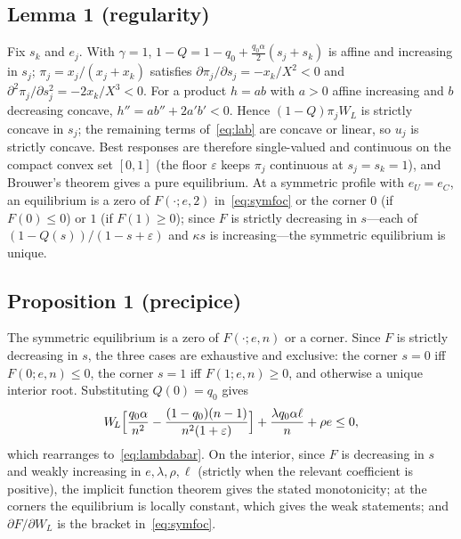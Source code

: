 \documentclass[11pt]{article}
\theoremstyle{plain}
\theoremstyle{definition}
\theoremstyle{remark}
\newcommand{\WL}{W_{\!L}}
\begin{document}
\subsection{Lemma 1 (regularity)}
Fix $s_k$ and $e_j$. With $\gamma=1$, $1-Q=1-q_0+\tfrac{q_0\alpha}{2}(s_j+s_k)$ is affine and increasing in $s_j$; $\pi_j=x_j/(x_j+x_k)$ satisfies $\partial\pi_j/\partial s_j=-x_k/X^2<0$ and $\partial^2\pi_j/\partial s_j^2=-2x_k/X^3<0$. For a product $h=ab$ with $a>0$ affine increasing and $b$ decreasing concave, $h''=ab''+2a'b'<0$. Hence $(1-Q)\pi_j\WL$ is strictly concave in $s_j$; the remaining terms of~\eqref{eq:lab} are concave or linear, so $u_j$ is strictly concave. Best responses are therefore single-valued and continuous on the compact convex set $[0,1]$ (the floor $\varepsilon$ keeps $\pi_j$ continuous at $s_j=s_k=1$), and Brouwer's theorem gives a pure equilibrium. At a symmetric profile with $e_U=e_C$, an equilibrium is a zero of $F(\cdot;e,2)$ in~\eqref{eq:symfoc} or the corner $0$ (if $F(0)\le0$) or $1$ (if $F(1)\ge0$); since $F$ is strictly decreasing in $s$---each of $(1-Q(s))/(1-s+\varepsilon)$ and $\kappa s$ is increasing---the symmetric equilibrium is unique.

\subsection{Proposition 1 (precipice)}
The symmetric equilibrium is a zero of $F(\cdot;e,n)$ or a corner. Since $F$ is strictly decreasing in $s$, the three cases are exhaustive and exclusive: the corner $s=0$ iff $F(0;e,n)\le0$, the corner $s=1$ iff $F(1;e,n)\ge0$, and otherwise a unique interior root. Substituting $Q(0)=q_0$ gives
\[
\WL\Bigl[\frac{q_0\alpha}{n^2}-\frac{(1-q_0)(n-1)}{n^2(1+\varepsilon)}\Bigr]+\frac{\lambda q_0\alpha\ell}{n}+\rho e\le0,
\]
which rearranges to~\eqref{eq:lambdabar}. On the interior, since $F$ is decreasing in $s$ and weakly increasing in $e,\lambda,\rho,\ell$ (strictly when the relevant coefficient is positive), the implicit function theorem gives the stated monotonicity; at the corners the equilibrium is locally constant, which gives the weak statements; and $\partial F/\partial\WL$ is the bracket in~\eqref{eq:symfoc}.
\end{document}
